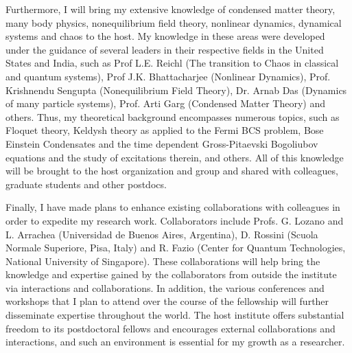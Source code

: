 \documentclass[a4paper,9pt]{article}
\begin{document}
Furthermore, I will bring my extensive knowledge of condensed matter theory, many body physics, nonequilibrium field theory, nonlinear dynamics, dynamical systems and chaos to the host. My knowledge in these areas were developed under the guidance of several leaders in their respective fields in the United States and India, such as Prof L.E. Reichl (The transition to Chaos in classical and quantum systems), Prof J.K. Bhattacharjee (Nonlinear Dynamics), Prof. Krishnendu Sengupta (Nonequilibrium Field Theory), Dr. Arnab Das (Dynamics of many particle systems), Prof. Arti Garg (Condensed Matter Theory) and others. Thus, my theoretical background encompasses numerous topics, such as  Floquet theory, Keldysh theory as applied to the Fermi BCS problem, Bose Einstein Condensates and the time dependent Gross-Pitaevski Bogoliubov equations and the study of excitations therein, and others. All of this knowledge will be brought to the host organization and group and shared with colleagues, graduate students and other postdocs.

Finally, I have made plans to enhance existing collaborations with colleagues in order to expedite my research work. Collaborators include  Profs. G. Lozano and L. Arrachea (Universidad de Buenos Aires, Argentina), D. Rossini (Scuola Normale Superiore, Pisa, Italy) and R. Fazio (Center for Quantum Technologies, National University of Singapore). These collaborations will help bring the knowledge and expertise gained by the collaborators from outside the institute via interactions and collaborations. In addition, the various conferences and workshops that I plan to attend over the course of the fellowship will further disseminate expertise throughout the world. The host institute offers substantial freedom to its postdoctoral fellows and encourages external collaborations and interactions, and such an environment is essential for my growth as a researcher.


\newpage
\end{document}
